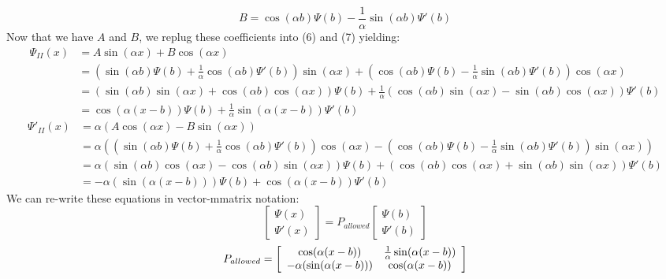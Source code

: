 \documentclass[10pt]{article} %
\begin{document}
\begin{equation}
B = \cos(\alpha b)\Psi (b) - \frac{1}{\alpha}\sin (\alpha b) \Psi ' (b)
\end{equation}
\noindent Now that we have $A$ and $B$, we replug these coefficients into (6) and (7) yielding:
\begin{align}
	\Psi _{II}(x) 	&= A\sin (\alpha x) + B\cos (\alpha x)\\
			&= \left(\sin(\alpha b)\Psi (b) + \frac{1}{\alpha}\cos (\alpha b) \Psi ' (b)\right) \sin (\alpha x) + \left(\cos(\alpha b)\Psi (b) - \frac{1}{\alpha}\sin (\alpha b) \Psi ' (b)\right)\cos (\alpha x)\\
			&= \left( \sin(\alpha b)\sin(\alpha x) + \cos(\alpha b)\cos(\alpha x) \right) \Psi(b) + \frac{1}{\alpha} \left(\cos(\alpha b)\sin(\alpha x) - \sin(\alpha b)\cos(\alpha x) \right) \Psi ' (b)\\
			&= \cos(\alpha(x - b))\Psi(b) + \frac{1}{\alpha}\sin(\alpha(x-b))\Psi'(b)
\end{align}
\begin{align}
	\Psi' _{II}(x) 	&= \alpha \left( A\cos (\alpha x) -  B\sin (\alpha x) \right)\\
			&= \alpha \left( \left(\sin(\alpha b)\Psi (b) + \frac{1}{\alpha}\cos (\alpha b) \Psi ' (b)\right)\cos (\alpha x) - \left(\cos(\alpha b)\Psi (b) - \frac{1}{\alpha}\sin (\alpha b) \Psi ' (b)\right)\sin (\alpha x) \right)\\
			&= \alpha(\sin(\alpha b)\cos(\alpha x) - \cos(\alpha b)\sin(\alpha x))\Psi(b) + (\cos(\alpha b)\cos(\alpha x) + \sin(\alpha b)\sin(\alpha x))\Psi ' (b)\\
			&= -\alpha(\sin(\alpha(x-b)))\Psi(b) + \cos(\alpha (x-b))\Psi'(b)
\end{align}
\noindent We can re-write these equations in vector-mmatrix notation:
\begin{equation}
\left[ \begin{array}{c} \Psi(x) \\ \Psi'(x)\end{array}\right] = P_{allowed} \left[ \begin{array}{c} \Psi(b) \\ \Psi'(b)\end{array}\right]
\end{equation}
\begin{equation}
P_{allowed} = \left[ \begin{array}{c c} \cos(\alpha(x-b)) & \frac{1}{\alpha}\sin(\alpha(x-b)) \\ -\alpha(\sin(\alpha(x-b))) & \cos(\alpha(x-b))\end{array}\right]
\end{equation}
\end{document}
